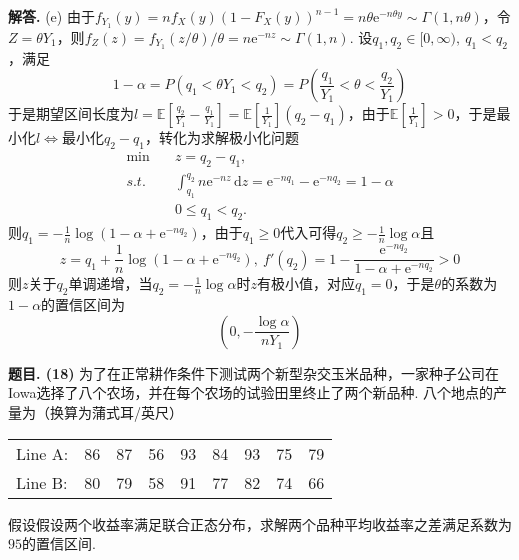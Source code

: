 \documentclass[12pt, a4paper, oneside]{ctexart}
\newcounter{problem}  %
\newenvironment{problem}[1][]{\stepcounter{problem}\par\noindent\textbf{题目\arabic{problem}. #1}}{\smallskip\par}
\newenvironment{solution}[1][]{\par\noindent\textbf{#1解答. }}{\smallskip\par}  %
\let\leq=\leqslant %
\let\geq=\geqslant %
\def\E{\mathbb{E}}          %
\def\d{\mathrm{d}}          %
\def\e{\mathrm{e}}          %
\def\add{\vspace{1ex}}      %
\def\del{\vspace{-1.5ex}}   %
\begin{document}
\begin{solution}
    (e) 由于$f_{Y_1}(y) = nf_X(y)(1-F_X(y))^{n-1} = n\theta\e^{-n\theta y}\sim \Gamma(1,n\theta)$，令$Z = \theta Y_1$，则$f_Z(z) = f_{Y_1}(z/\theta)/\theta = n\e^{-nz}\sim \Gamma(1,n)$. 设$q_1,q_2\in [0,\infty),\ q_1 < q_2$，满足
    \begin{equation*}
        1-\alpha = P(q_1 < \theta Y_1 < q_2) = P\left(\frac{q_1}{Y_1} < \theta < \frac{q_2}{Y_1}\right)
    \end{equation*}
    于是期望区间长度为\add $l = \E\left[\frac{q_2}{Y_1}-\frac{q_1}{Y_1}\right] = \E\left[\frac{1}{Y_1}\right](q_2-q_1)$，由于$\E\left[\frac{1}{Y_1}\right]>0$，于是最小化$l\iff$最小化$q_2-q_1$，转化为求解极小化问题
    \begin{align*}
        \min&\quad z=q_2-q_1,\\
        s.t.&\quad \int_{q_1}^{q_2}n\e^{-nz}\,\d z = \e^{-nq_1}-\e^{-nq_2} = 1-\alpha\\
        &\quad 0 \leq q_1 < q_2.
    \end{align*}
    则$q_1 = -\frac{1}{n}\log(1-\alpha + \e^{-nq_2})$，由于$q_1 \geq 0$代入可得$q_2\geq -\frac{1}{n}\log \alpha$且
    \begin{equation*}
        z = q_1+\frac{1}{n}\log(1-\alpha+\e^{-nq_2}),\ f'(q_2)=1-\frac{\e^{-nq_2}}{1-\alpha+\e^{-nq_2}} > 0
    \end{equation*}
    则$z$关于$q_2$单调递增，当$q_2 = -\frac{1}{n}\log\alpha$时$z$有极小值，对应$q_1 = 0$，于是$\theta$的系数为$1-\alpha$的置信区间为
    \begin{equation*}
        \left(0,-\frac{\log\alpha}{nY_1}\right)
    \end{equation*}
\end{solution}
\begin{problem}[(18)]
    为了在正常耕作条件下测试两个新型杂交玉米品种，一家种子公司在Iowa选择了八个农场，并在每个农场的试验田里终止了两个新品种. 八个地点的产量为（换算为蒲式耳/英尺）\del
\renewcommand\arraystretch{0.8} %
\begin{table}[!htbp] %
    \centering %
    \begin{tabular}{p{3cm}<{\centering}p{1cm}<{\centering}p{1cm}<{\centering}p{1cm}<{\centering}p{1cm}<{\centering}p{1cm}<{\centering}p{1cm}<{\centering}p{1cm}<{\centering}p{1cm}<{\centering}} %
        Line A:&86&87&56&93&84&93&75&79\\
        Line B:&80&79&58&91&77&82&74&66\\
    \end{tabular}
\end{table}\del

假设假设两个收益率满足联合正态分布，求解两个品种平均收益率之差满足系数为$95$的置信区间.
\end{problem}
\end{document}

